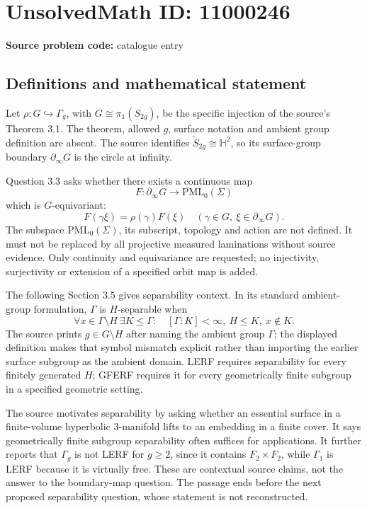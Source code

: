 \documentclass[11pt]{article}
\begin{document}
\section*{UnsolvedMath ID: 11000246}
\textbf{Source problem code:} catalogue entry
\subsection{Definitions and mathematical statement}
Let \(\rho:G\hookrightarrow\Gamma_g\), with \(G\cong\pi_1(S_{2g})\), be the specific injection of the source's Theorem 3.1. The theorem, allowed \(g\), surface notation and ambient group definition are absent. The source identifies \(\widetilde S_{2g}\cong\mathbb H^2\), so its surface-group boundary \(\partial_\infty G\) is the circle at infinity.

Question 3.3 asks whether there exists a continuous map
\[
 F:\partial_\infty G\longrightarrow\mathrm{PML}_0(\Sigma)
\]
which is \(G\)-equivariant:
\[
 F(\gamma\xi)=\rho(\gamma)F(\xi)
       \quad(\gamma\in G,\ \xi\in\partial_\infty G).
\]
The subspace \(\mathrm{PML}_0(\Sigma)\), its subscript, topology and action are not defined. It must not be replaced by all projective measured laminations without source evidence. Only continuity and equivariance are requested; no injectivity, surjectivity or extension of a specified orbit map is added.

The following Section 3.5 gives separability context. In its standard ambient-group formulation, \(\Gamma\) is \(H\)-separable when
\[
 \forall x\in\Gamma\setminus H\ \exists K\le\Gamma:\quad
 [\Gamma:K]<\infty,\ H\le K,\ x\notin K.
\]
The source prints \(g\in G\setminus H\) after naming the ambient group \(\Gamma\); the displayed definition makes that symbol mismatch explicit rather than importing the earlier surface subgroup as the ambient domain. LERF requires separability for every finitely generated \(H\); GFERF requires it for every geometrically finite subgroup in a specified geometric setting.

The source motivates separability by asking whether an essential surface in a finite-volume hyperbolic \(3\)-manifold lifts to an embedding in a finite cover. It says geometrically finite subgroup separability often suffices for applications. It further reports that \(\Gamma_g\) is not LERF for \(g\ge2\), since it contains \(F_2\times F_2\), while \(\Gamma_1\) is LERF because it is virtually free. These are contextual source claims, not the answer to the boundary-map question. The passage ends before the next proposed separability question, whose statement is not reconstructed.
\end{document}
